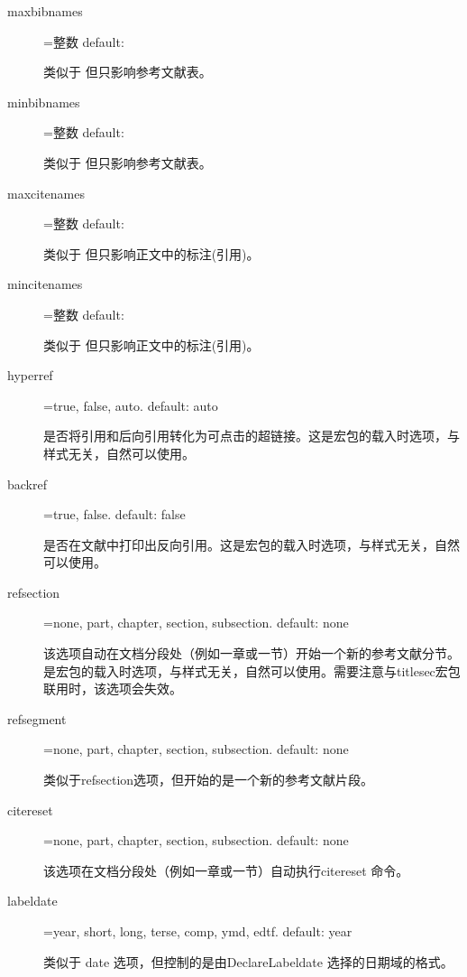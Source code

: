 \begin{description}
  \item[maxbibnames]=整数 \hfill default: 

  类似于  但只影响参考文献表。

  \item[minbibnames]=整数 \hfill default: 

  类似于   但只影响参考文献表。

  \item[maxcitenames]=整数 \hfill default: 

  类似于  但只影响正文中的标注(引用)。

  \item[mincitenames]=整数 \hfill default: 

  类似于  但只影响正文中的标注(引用)。

  \item[hyperref]=true, false, auto. \hfill default: auto

  是否将引用和后向引用转化为可点击的超链接。这是宏包的载入时选项，与样式无关，自然可以使用。

  \item[backref]=true, false. \hfill default: false

  是否在文献中打印出反向引用。这是宏包的载入时选项，与样式无关，自然可以使用。

  \item[refsection]=none, part, chapter, section, subsection. \hfill default: none

  该选项自动在文档分段处（例如一章或一节）开始一个新的参考文献分节。是宏包的载入时选项，与样式无关，自然可以使用。需要注意与titlesec宏包联用时，该选项会失效。

  \item[refsegment]=none, part, chapter, section, subsection. \hfill default: none

  类似于refsection选项，但开始的是一个新的参考文献片段。

  \item[citereset]=none, part, chapter, section, subsection. \hfill default: none

  该选项在文档分段处（例如一章或一节）自动执行citereset 命令。

  \item[labeldate]=year, short, long, terse, comp, ymd, edtf. \hfill default: year

  类似于 date 选项，但控制的是由DeclareLabeldate 选择的日期域的格式。


\end{description}
